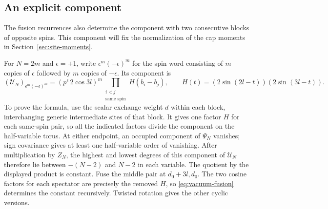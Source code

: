 \subsection{An explicit component}

The fusion recurrences also determine the component with two consecutive blocks of opposite spins. This component will fix the normalization of the cap moments in Section~\ref{sec:site-moments}.

For \(N=2m\) and \(\epsilon=\pm1\), write \(\epsilon^m(-\epsilon)^m\) for the spin word consisting of \(m\) copies of \(\epsilon\) followed by \(m\) copies of \(-\epsilon\). Its component is
\begin{equation}\label{eq:two-block-component}
 (\mathcal U_N)_{\epsilon^m(-\epsilon)^m}
 =(p^\epsilon\,2\cos 3l)^m\!
 \prod_{\substack{i<j\\\text{same spin}}}
 H(b_i-b_j),\qquad H(t)=(2\sin(2l-t))(2\sin(3l-t)).
\end{equation}
To prove the formula, use the scalar exchange weight \(d\) within each block, interchanging generic intermediate sites of that block. It gives one factor \(H\) for each same-spin pair, so all the indicated factors divide the component on the half-variable torus. At either endpoint, an occupied component of \(\Psi_N\) vanishes; sign covariance gives at least one half-variable order of vanishing. After multiplication by \(Z_N\), the highest and lowest degrees of this component of \(\mathcal U_N\) therefore lie between \(-(N-2)\) and \(N-2\) in each variable. The quotient by the displayed product is constant. Fuse the middle pair at \(d_0+3l,d_0\). The two cosine factors for each spectator are precisely the removed \(H\), so \eqref{eq:vacuum-fusion} determines the constant recursively. Twisted rotation gives the other cyclic versions.
